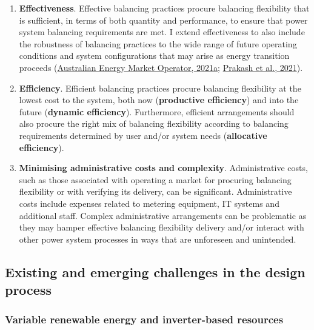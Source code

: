 \documentclass[12pt,a4paper,]{report}
\begin{document}
\begin{enumerate}
\def\labelenumi{\arabic{enumi}.}
\item
  \textbf{Effectiveness}. Effective balancing practices procure
  balancing flexibility that is sufficient, in terms of both quantity
  and performance, to ensure that power system balancing requirements
  are met. I extend effectiveness to also include the robustness of
  balancing practices to the wide range of future operating conditions
  and system configurations that may arise as energy transition proceeds
  (\protect\hyperlink{ref-australianenergymarketoperatorEnduringPrimaryFrequency2021}{Australian
  Energy Market Operator, 2021a};
  \protect\hyperlink{ref-prakashResponseFrequencyControl2021}{Prakash et
  al., 2021}).
\item
  \textbf{Efficiency}. Efficient balancing practices procure balancing
  flexibility at the lowest cost to the system, both now
  (\textbf{productive efficiency}) and into the future (\textbf{dynamic
  efficiency}). Furthermore, efficient arrangements should also procure
  the right mix of balancing flexibility according to balancing
  requirements determined by user and/or system needs
  (\textbf{allocative efficiency}).
\item
  \textbf{Minimising administrative costs and complexity}.
  Administrative costs, such as those associated with operating a market
  for procuring balancing flexibility or with verifying its delivery,
  can be significant. Administrative costs include expenses related to
  metering equipment, IT systems and additional staff. Complex
  administrative arrangements can be problematic as they may hamper
  effective balancing flexibility delivery and/or interact with other
  power system processes in ways that are unforeseen and unintended.
\end{enumerate}

\hypertarget{sec:lit_review-design_challenges}{%
\subsection{Existing and emerging challenges in the design
process}\label{sec:lit_review-design_challenges}}

\hypertarget{variable-renewable-energy-and-inverter-based-resources}{%
\subsubsection{Variable renewable energy and inverter-based
resources}\label{variable-renewable-energy-and-inverter-based-resources}}
\end{document}
